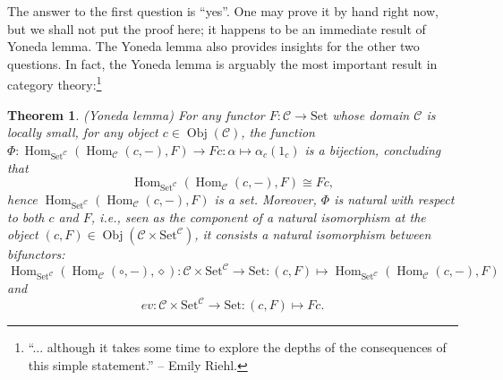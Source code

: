 \documentclass{article}
\newtheorem{theorem}{Theorem}[section]
\theoremstyle{definition}
\theoremstyle{definition}
\theoremstyle{remark}
\DeclareMathOperator{\Obj}{Obj}
\DeclareMathOperator{\Hom}{Hom}
\begin{document}
	The answer to the first question is ``yes''. One may prove it by hand right now, but we shall not put the proof here; it happens to be an immediate result of Yoneda lemma. The Yoneda lemma also provides insights for the other two questions. In fact, the Yoneda lemma is arguably the most important result in category theory:\footnote{``... although it takes some time to explore the depths of the consequences of this simple statement.'' -- Emily Riehl.}
	\begin{theorem}(Yoneda lemma)
		For any functor $F:\mathcal{C}\to \mathrm{Set}$ whose domain $\mathcal{C}$ is locally small, for any object $c\in\Obj(\mathcal{C})$, the function $\Phi:\Hom_{\mathrm{Set}^{\mathcal{C}}}(\Hom_\mathcal{C}(c,-),F)\to Fc:\alpha\mapsto \alpha_c(1_c)$ is a bijection, concluding that
		\[\Hom_{\mathrm{Set}^\mathcal{C}}(\Hom_\mathcal{C}(c,-),F)\cong Fc,\]
		hence $\Hom_{\mathrm{Set}^\mathcal{C}}(\Hom_\mathcal{C}(c,-),F)$ is a set. Moreover, $\Phi$ is natural with respect to both $c$ and $F$, i.e., seen as the component of a natural isomorphism at the object $(c,F)\in\Obj(\mathcal{C}\times\mathrm{Set}^\mathcal{C})$, it consists a natural isomorphism between bifunctors:
		\[\Hom_{\mathrm{Set}^\mathcal{C}}(\Hom_\mathcal{C}(\circ,-),\diamond):\mathcal{C}\times\mathrm{Set}^\mathcal{C}\to \mathrm{Set}:(c,F)\mapsto \Hom_{\mathrm{Set}^{\mathcal{C}}}(\Hom_\mathcal{C}(c,-),F)\]
		and
		\[ev:\mathcal{C}\times\mathrm{Set}^\mathcal{C}\to \mathrm{Set}:(c,F)\mapsto Fc.\]
	\end{theorem}
\end{document}
